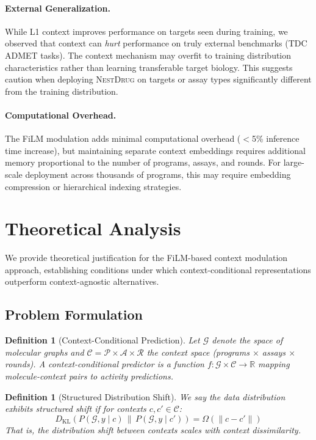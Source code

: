 \documentclass[sigconf]{acmart}
\newcommand{\methodname}{\textsc{NestDrug}}
\newtheorem{definition}[theorem]{Definition}
\begin{document}
\paragraph{External Generalization.}
While L1 context improves performance on targets seen during training, we observed that context can \textit{hurt} performance on truly external benchmarks (TDC ADMET tasks). The context mechanism may overfit to training distribution characteristics rather than learning transferable target biology. This suggests caution when deploying \methodname{} on targets or assay types significantly different from the training distribution.

\paragraph{Computational Overhead.}
The FiLM modulation adds minimal computational overhead ($<$5\% inference time increase), but maintaining separate context embeddings requires additional memory proportional to the number of programs, assays, and rounds. For large-scale deployment across thousands of programs, this may require embedding compression or hierarchical indexing strategies.

\section{Theoretical Analysis}
\label{app:theory}

We provide theoretical justification for the FiLM-based context modulation approach, establishing conditions under which context-conditional representations outperform context-agnostic alternatives.

\subsection{Problem Formulation}

\begin{definition}[Context-Conditional Prediction]
Let $\mathcal{G}$ denote the space of molecular graphs and $\mathcal{C} = \mathcal{P} \times \mathcal{A} \times \mathcal{R}$ the context space (programs $\times$ assays $\times$ rounds). A context-conditional predictor is a function $f: \mathcal{G} \times \mathcal{C} \rightarrow \mathbb{R}$ mapping molecule-context pairs to activity predictions.
\end{definition}

\begin{definition}[Structured Distribution Shift]
We say the data distribution exhibits \textit{structured shift} if for contexts $c, c' \in \mathcal{C}$:
\begin{equation}
    D_{\text{KL}}\left( P(\mathcal{G}, y \mid c) \,\|\, P(\mathcal{G}, y \mid c') \right) = \Omega(\|c - c'\|)
\end{equation}
That is, the distribution shift between contexts scales with context dissimilarity.
\end{definition}
\end{document}

